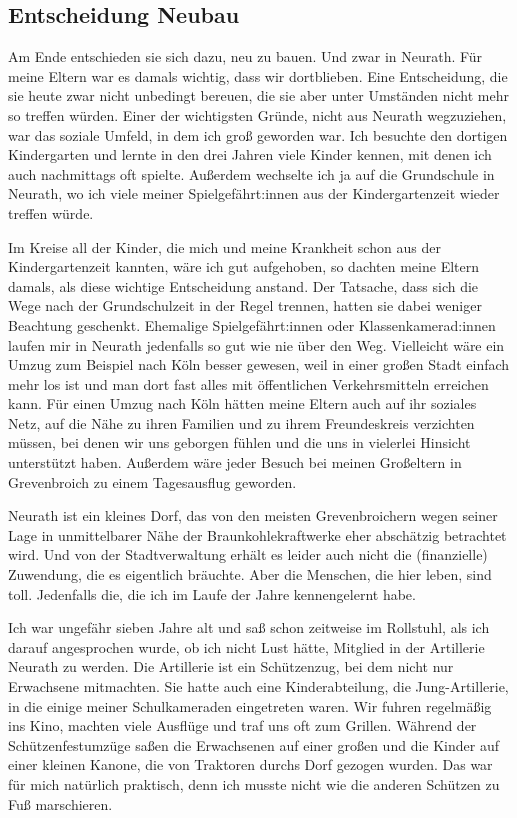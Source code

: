 \documentclass[fontsize=14pt,a4paper,headinclude,DIV=calc,automark]{scrbook}
\begin{document}
\subsection{Entscheidung Neubau}

Am Ende entschieden sie sich dazu, neu zu bauen. Und zwar in Neurath. Für meine Eltern war es damals wichtig, dass wir dortblieben. Eine Entscheidung, die sie heute zwar nicht unbedingt bereuen, die sie aber unter Umständen nicht mehr so treffen würden. Einer der wichtigsten Gründe, nicht aus Neurath wegzuziehen, war das soziale Umfeld, in dem ich groß geworden war. Ich besuchte den dortigen Kindergarten und lernte in den drei Jahren viele Kinder kennen, mit denen ich auch nachmittags oft spielte. Außerdem wechselte ich ja auf die Grundschule in Neurath, wo ich viele meiner Spielgefährt:innen aus der Kindergartenzeit wieder treffen würde.

Im Kreise all der Kinder, die mich und meine Krankheit schon aus der Kindergartenzeit kannten, wäre ich gut aufgehoben, so dachten meine Eltern damals, als diese wichtige Entscheidung anstand. Der Tatsache, dass sich die Wege nach der Grundschulzeit in der Regel trennen, hatten sie dabei weniger Beachtung geschenkt. Ehemalige Spielgefährt:innen oder Klassenkamerad:innen laufen mir in Neurath jedenfalls so gut wie nie über den Weg. Vielleicht wäre ein Umzug zum Beispiel nach Köln besser gewesen, weil in einer großen Stadt einfach mehr los ist und man dort fast alles mit öffentlichen Verkehrsmitteln erreichen kann. Für einen Umzug nach Köln hätten meine Eltern auch auf ihr soziales Netz, auf die Nähe zu ihren Familien und zu ihrem Freundeskreis verzichten müssen, bei denen wir uns geborgen fühlen und die uns in vielerlei Hinsicht unterstützt haben. Außerdem wäre jeder Besuch bei meinen Großeltern in Grevenbroich zu einem Tagesausflug geworden.

Neurath ist ein kleines Dorf, das von den meisten Grevenbroichern wegen seiner Lage in unmittelbarer Nähe der Braunkohlekraftwerke eher abschätzig betrachtet wird. Und von der Stadtverwaltung erhält es leider auch nicht die (finanzielle) Zuwendung, die es eigentlich bräuchte. Aber die Menschen, die hier leben, sind toll. Jedenfalls die, die ich im Laufe der Jahre kennengelernt habe.

Ich war ungefähr sieben Jahre alt und saß schon zeitweise im Rollstuhl, als ich darauf angesprochen wurde, ob ich nicht Lust hätte, Mitglied in der Artillerie Neurath zu werden. Die Artillerie ist ein Schützenzug, bei dem nicht nur Erwachsene mitmachten. Sie hatte auch eine Kinderabteilung, die Jung-Artillerie, in die einige meiner Schulkameraden eingetreten waren. Wir fuhren regelmäßig ins Kino, machten viele Ausflüge und traf uns oft zum Grillen. Während der Schützenfestumzüge saßen die Erwachsenen auf einer großen und die Kinder auf einer kleinen Kanone, die von Traktoren durchs Dorf gezogen wurden. Das war für mich natürlich praktisch, denn ich musste nicht wie die anderen Schützen zu Fuß marschieren.
\end{document}

